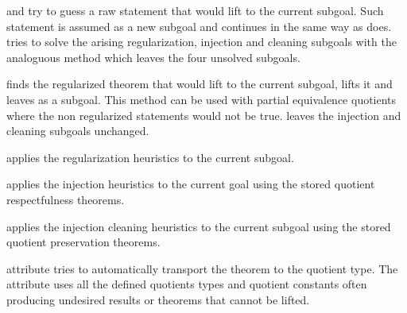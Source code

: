 \begin{isabellebody}
\begin{isamarkuptext}
\begin{description}
  \item \hyperlink{method.HOL.descending}{\mbox{}} and \hyperlink{method.HOL.descending-setup}{\mbox{}} try to guess a raw statement that would lift
    to the current subgoal. Such statement is assumed as a new subgoal
    and \hyperlink{method.HOL.descending}{\mbox{}} continues in the same way as
    \hyperlink{method.HOL.lifting}{\mbox{}} does. \hyperlink{method.HOL.descending}{\mbox{}} tries
    to solve the arising regularization, injection and cleaning
    subgoals with the analoguous method \hyperlink{method.HOL.descending-setup}{\mbox{}} which leaves the four unsolved subgoals.

  \item \hyperlink{method.HOL.partiality-descending}{\mbox{}} finds the regularized
    theorem that would lift to the current subgoal, lifts it and
    leaves as a subgoal. This method can be used with partial
    equivalence quotients where the non regularized statements would
    not be true. \hyperlink{method.HOL.partiality-descending-setup}{\mbox{}} leaves
    the injection and cleaning subgoals unchanged.

  \item \hyperlink{method.HOL.regularize}{\mbox{}} applies the regularization
    heuristics to the current subgoal.

  \item \hyperlink{method.HOL.injection}{\mbox{}} applies the injection heuristics
    to the current goal using the stored quotient respectfulness
    theorems.

  \item \hyperlink{method.HOL.cleaning}{\mbox{}} applies the injection cleaning
    heuristics to the current subgoal using the stored quotient
    preservation theorems.

  \item \hyperlink{attribute.HOL.quot-lifted}{\mbox{}} attribute tries to
    automatically transport the theorem to the quotient type.
    The attribute uses all the defined quotients types and quotient
    constants often producing undesired results or theorems that
    cannot be lifted.


\end{description}
\end{isamarkuptext}
\end{isabellebody}
